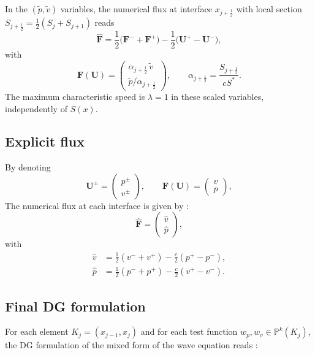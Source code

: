 \documentclass[11pt,a4paper]{report}
\theoremstyle{plain}
\theoremstyle{definition}
\begin{document}
In the $(\tilde p, \tilde v)$ variables, the numerical flux at interface
$x_{j+\frac12}$ with local section $S_{j+\frac12}=\frac12(S_j+S_{j+1})$ reads
\begin{equation}
    \widehat{\mathbf{F}} =
    \frac{1}{2}\bigl(\mathbf{F}^- + \mathbf{F}^+\bigr)
    - \frac{1}{2}\bigl(\mathbf{U}^+ - \mathbf{U}^-\bigr),
    \label{eq:rusanov_tilde}
\end{equation}
with
\begin{equation}
    \mathbf{F}(\mathbf{U}) =
    \begin{pmatrix}
        \alpha_{j+\frac12}\,\tilde{v}\\[4pt]
        \tilde{p}/\alpha_{j+\frac12}
    \end{pmatrix},
    \qquad
    \alpha_{j+\frac12} = \frac{S_{j+\frac12}}{cS^\ast}.
\end{equation}
The maximum characteristic speed is $\lambda = 1$ in these scaled variables,
independently of $S(x)$.


\subsection{Explicit flux}
By denoting
$$
\mathbf U^\pm =
\begin{pmatrix}
p^\pm\\
v^\pm
\end{pmatrix},
\qquad
\mathbf F(\mathbf U)=
\begin{pmatrix}
v\\
p
\end{pmatrix},
$$
The numerical flux at each interface is given by :
$$
\widehat{\mathbf F} =
\begin{pmatrix}
\widehat{v}\\
\widehat{p}
\end{pmatrix},
$$
with
$$
\boxed{
\begin{aligned}
\widehat{v}
& =
\frac12\left(v^-+v^+\right)
-
\frac{c}{2}\left(p^+-p^-\right),
\\
\widehat{p}
& =
\frac12\left(p^-+p^+\right)
-
\frac{c}{2}\left(v^+-v^-\right).
\end{aligned}
}
$$

\subsection{Final DG formulation}
For each element $K_j=(x_{j-1},x_j)$ and 
for each test function $w_p,w_v\in\mathbb P^k(K_j)$, 
the DG formulation of the mixed form of the wave equation reads :
\end{document}
